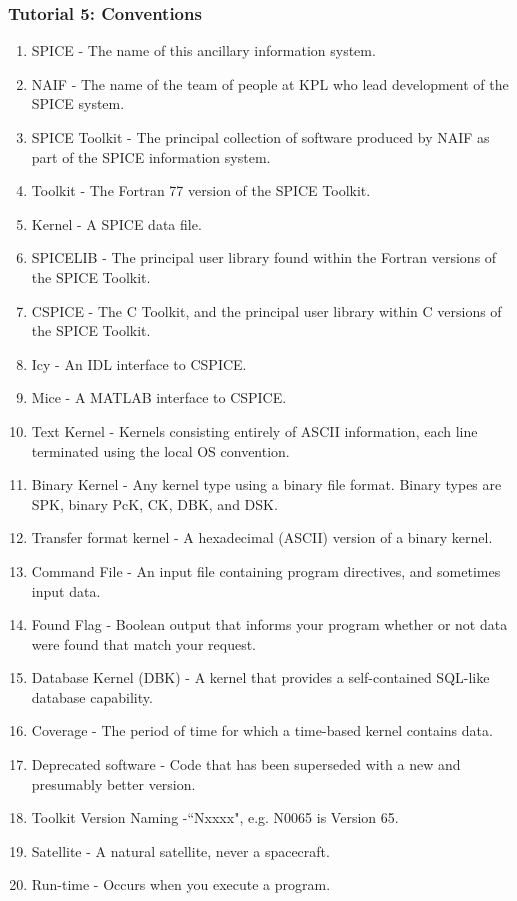 \documentclass[crop=false,class=book]{standalone}
\begin{document}
\subsubsection{Tutorial 5: Conventions}
\begin{enumerate}
    \item SPICE - The name of this ancillary information system.
    \item NAIF - The name of the team of people at KPL who lead development of the SPICE system.
    \item SPICE Toolkit - The principal collection of software produced by NAIF as part of the SPICE information system.
    \item Toolkit - The Fortran 77 version of the SPICE Toolkit.
    \item Kernel - A SPICE data file.
    \item SPICELIB - The principal user library found within the Fortran versions of the SPICE Toolkit.
    \item CSPICE - The C Toolkit, and the principal user library within C versions of the SPICE Toolkit.
    \item Icy - An IDL interface to CSPICE.
    \item Mice - A MATLAB interface to CSPICE.
    \item Text Kernel - Kernels consisting entirely of ASCII information, each line terminated using the local OS convention.
    \item Binary Kernel - Any kernel type using a binary file format. Binary types are SPK, binary PcK, CK, DBK, and DSK.
    \item Transfer format kernel - A hexadecimal (ASCII) version of a binary kernel.
    \item Command File - An input file containing program directives, and sometimes input data.
    \item Found Flag - Boolean output that informs your program whether or not data were found that match your request.
    \item Database Kernel (DBK) - A kernel that provides a self-contained SQL-like database capability.
    \item Coverage - The period of time for which a time-based kernel contains data.
    \item Deprecated software - Code that has been superseded with a new and presumably better version.
    \item Toolkit Version Naming -``Nxxxx", e.g. N0065 is Version 65.
    \item Satellite - A natural satellite, never a spacecraft.
    \item Run-time - Occurs when you execute a program.
\end{enumerate}
\end{document}
